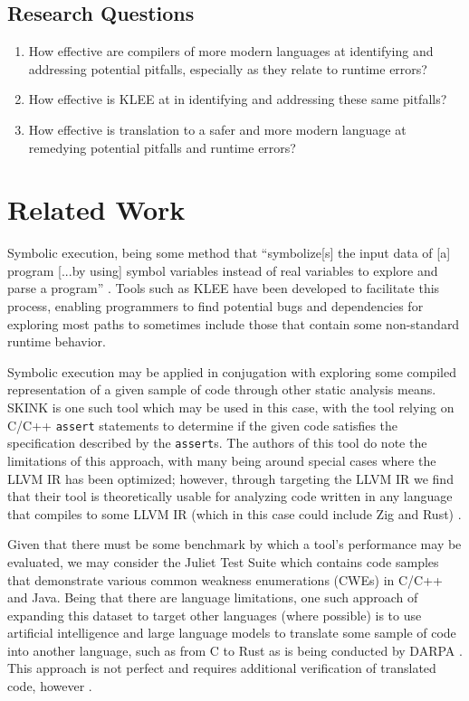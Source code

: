 \documentclass[conference]{IEEEtran}
\begin{document}
\subsection{Research Questions}
\begin{enumerate}
    \item How effective are compilers of more modern languages at identifying and
        addressing potential pitfalls, especially as they relate to runtime errors?
    \item How effective is KLEE at in identifying and addressing these same
        pitfalls?
    \item How effective is translation to a safer and more modern language at
        remedying potential pitfalls and runtime errors?
\end{enumerate}


\section{Related Work}
Symbolic execution, being some method that ``symbolize[s] the input data of
[a] program [...by using] symbol variables instead of real variables to
explore and parse a program'' \cite{zhang2020survey}. Tools such as KLEE
\cite{cadar2021klee} have been developed to facilitate this process,
enabling programmers to find potential bugs and dependencies for exploring
most paths to sometimes include those that contain some non-standard runtime
behavior.

Symbolic execution may be applied in conjugation with exploring some compiled
representation of a given sample of code through other static analysis means.
SKINK \cite{cassez2017skink} is one such tool which may be used in this case,
with the tool relying on C/C++ \texttt{assert} statements to determine if the
given code satisfies the specification described by the \texttt{assert}s. The
authors of this tool do note the limitations of this approach, with many
being around special cases where the LLVM IR has been optimized; however,
through targeting the LLVM IR we find that their tool is theoretically
usable for analyzing code written in any language that compiles to some LLVM
IR (which in this case could include Zig and Rust) \cite{cassez2017skink}.

Given that there must be some benchmark by which a tool's performance may
be evaluated, we may consider the Juliet Test Suite \cite{boland2012juliet}
which contains code samples that demonstrate various common weakness
enumerations (CWEs) in C/C++ and Java. Being that there are language
limitations, one such approach of expanding this dataset to target other
languages (where possible) is to use artificial intelligence and large
language models to translate some sample of code into another language, such
as from C to Rust as is being conducted by DARPA \cite{emre2021translating}.
This approach is not perfect and requires additional verification of
translated code, however \cite{fulton2025how}.
\end{document}
